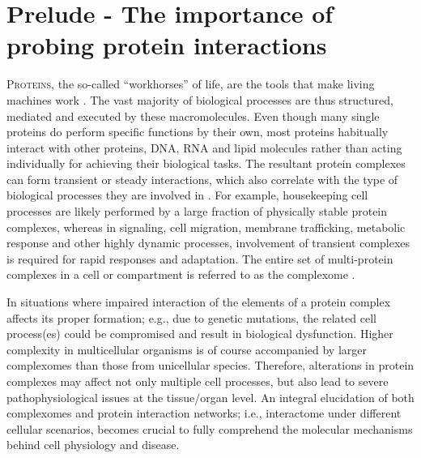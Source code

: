 \section{Prelude - The importance of probing protein interactions}
\lettrine[lraise=0.1, nindent=0em, slope=-.5em]{P}{roteins}, the so-called “workhorses” of life, are the tools that make living machines work  \cite{Adams_2008}. The vast majority of biological processes are thus structured, mediated and executed by these macromolecules. Even though many single proteins do perform specific functions by their own, most proteins habitually interact with other proteins, DNA, RNA and lipid molecules rather than acting individually for achieving their biological tasks. The resultant protein complexes can form transient or steady interactions, which also correlate with the type of biological processes they are involved in \cite{De_Las_Rivas_2010}. For example, housekeeping cell processes are likely performed by a large fraction of physically stable protein complexes, whereas in signaling, cell migration, membrane trafficking, metabolic response and other highly dynamic processes, involvement of transient complexes is required for rapid responses and adaptation. The entire set of multi-protein complexes in a cell or compartment is referred to as the complexome \cite{Ceulemans_2006, Deshaies_2002, Lasserre_2006}.

In situations where impaired interaction of the elements of a protein complex affects its proper formation; e.g., due to genetic mutations, the related cell process(es) could be compromised and result in biological dysfunction. Higher complexity in multicellular organisms is of course accompanied by larger complexomes than those from unicellular species. Therefore, alterations in protein complexes may affect not only multiple cell processes, but also lead to severe pathophysiological issues at the tissue/organ level. An integral elucidation of both complexomes and protein interaction networks; i.e., interactome \cite{Vidal_2011} under different cellular scenarios, becomes crucial to fully comprehend the molecular mechanisms behind cell physiology and disease.

